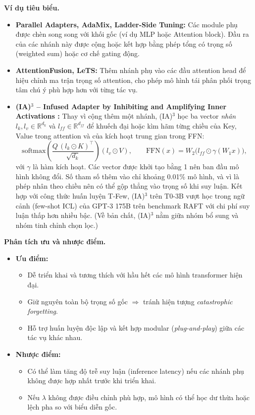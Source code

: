 \textbf{Ví dụ tiêu biểu.}
\begin{itemize}
	\item \textbf{Parallel Adapters\cite{pfeiffer2021adapterfusion}, AdaMix\cite{chen2022adamixture}, Ladder-Side Tuning\cite{he2021laddersidetuning}:}  
	Các module phụ được chèn song song với khối gốc (ví dụ MLP hoặc Attention block). Đầu ra của các nhánh này được cộng hoặc kết hợp bằng phép tổng có trọng số (weighted sum) hoặc cơ chế gating động.
	\item \textbf{AttentionFusion, LeTS\cite{he2022towards}:}  
	Thêm nhánh phụ vào các đầu attention head để hiệu chỉnh ma trận trọng số attention, cho phép mô hình tái phân phối trọng tâm chú ý phù hợp hơn với từng tác vụ.
	\item \textbf{(IA)$^3$ -- Infused Adapter by Inhibiting and Amplifying Inner Activations \cite{liu2022ia3}:}
	Thay vì cộng thêm một nhánh, (IA)$^3$ học ba vector \emph{nhân} $l_k, l_v \in \mathbb{R}^{d_k}$ và $l_{ff} \in \mathbb{R}^{d_{ff}}$ để khuếch đại hoặc kìm hãm từng chiều của Key, Value trong attention và của kích hoạt trung gian trong FFN:
	\[
	\text{softmax}\!\left(\frac{Q\,(l_k \odot K)^\top}{\sqrt{d_k}}\right)(l_v \odot V), \qquad
	\text{FFN}(x) = W_2\big(l_{ff} \odot \gamma(W_1 x)\big),
	\]
	với $\gamma$ là hàm kích hoạt. Các vector được khởi tạo bằng 1 nên ban đầu mô hình không đổi. Số tham số thêm vào chỉ khoảng 0.01\% mô hình, và vì là phép nhân theo chiều nên có thể gộp thẳng vào trọng số khi suy luận. Kết hợp với công thức huấn luyện T-Few, (IA)$^3$ trên T0-3B vượt học trong ngữ cảnh (few-shot ICL) của GPT-3 175B trên benchmark RAFT với chi phí suy luận thấp hơn nhiều bậc. (Về bản chất, (IA)$^3$ nằm giữa nhóm bổ sung và nhóm tinh chỉnh chọn lọc.)
\end{itemize}

\textbf{Phân tích ưu và nhược điểm.}
\begin{itemize}
	\item \textbf{Ưu điểm:}  
	\begin{itemize}
		\item Dễ triển khai và tương thích với hầu hết các mô hình transformer hiện đại.  
		\item Giữ nguyên toàn bộ trọng số gốc $\Rightarrow$ tránh hiện tượng \textit{catastrophic forgetting}.  
		\item Hỗ trợ huấn luyện độc lập và kết hợp modular (\textit{plug-and-play}) giữa các tác vụ khác nhau.  
	\end{itemize}
	\item \textbf{Nhược điểm:}  
	\begin{itemize}
		\item Có thể làm tăng độ trễ suy luận (inference latency) nếu các nhánh phụ không được hợp nhất trước khi triển khai.  
		\item Nếu $\lambda$ không được điều chỉnh phù hợp, mô hình có thể học dư thừa hoặc lệch pha so với biểu diễn gốc.  
	\end{itemize}
\end{itemize}

